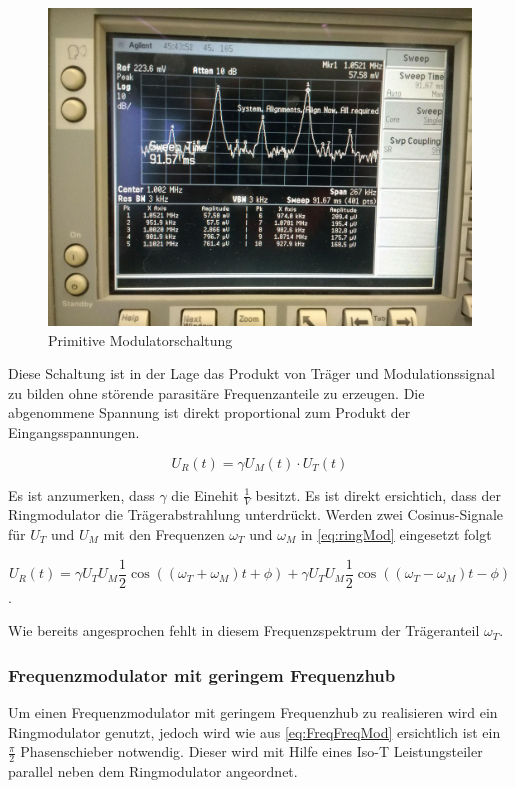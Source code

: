 \begin{figure}
	\centering
	\includegraphics[width=\textwidth]{img/Aufgabenteil_b.jpg}
	\caption{Primitive Modulatorschaltung}
	\label{abb:ringMod}
\end{figure}

Diese Schaltung ist in der Lage das Produkt von Träger und Modulationssignal zu bilden ohne störende parasitäre Frequenzanteile zu erzeugen. Die abgenommene Spannung ist direkt proportional zum Produkt der Eingangsspannungen.

\begin{equation}
U_R(t) = \gamma U_M(t) \cdot U_T(t)
\label{eq:ringMod}
\end{equation}

Es ist anzumerken, dass $\gamma$ die Einehit $\frac{1}{V}$ besitzt. Es ist direkt ersichtich, dass der Ringmodulator die Trägerabstrahlung unterdrückt. Werden zwei Cosinus-Signale für $U_T$ und $U_M$ mit den Frequenzen $\omega_T$ und $\omega_M$ in \ref{eq:ringMod} eingesetzt folgt

\begin{equation}
U_R(t) = \gamma U_T U_M \frac{1}{2}\cos((\omega_T + \omega_M)t + \phi) + \gamma U_T U_M \frac{1}{2} \cos((\omega_T - \omega_M)t - \phi)
\end{equation}
.

Wie bereits angesprochen fehlt in diesem Frequenzspektrum der Trägeranteil $\omega_T$.

\subsubsection{Frequenzmodulator mit geringem Frequenzhub}
Um einen Frequenzmodulator mit geringem Frequenzhub zu realisieren wird ein Ringmodulator genutzt, jedoch wird wie aus \ref{eq:FreqFreqMod} ersichtlich ist ein $\frac{\pi}{2}$ Phasenschieber notwendig. Dieser wird mit Hilfe eines Iso-T Leistungsteiler parallel neben dem Ringmodulator angeordnet.

